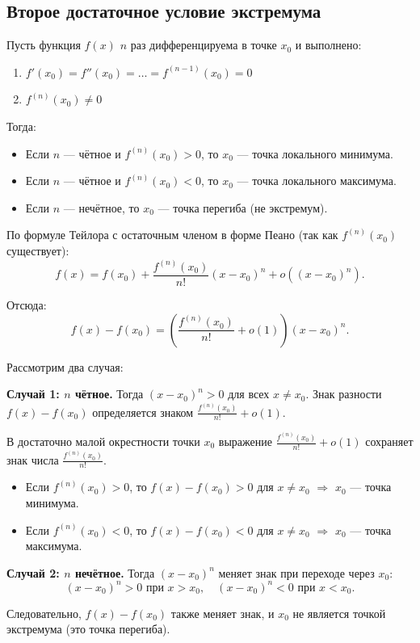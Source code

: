 \subsection{Второе достаточное условие экстремума}

\begin{theorem}
    Пусть функция \(f(x)\) \(n\) раз дифференцируема в точке \(x_0\) и выполнено:
    \begin{enumerate}
        \item \(f'(x_0) = f''(x_0) = \dots = f^{(n-1)}(x_0) = 0\)
        \item \(f^{(n)}(x_0) \neq 0\)
    \end{enumerate}
    
    Тогда:
    \begin{itemize}
        \item Если \(n\) — чётное и \(f^{(n)}(x_0) > 0\), то \(x_0\) — точка локального минимума.
        \item Если \(n\) — чётное и \(f^{(n)}(x_0) < 0\), то \(x_0\) — точка локального максимума.
        \item Если \(n\) — нечётное, то \(x_0\) — точка перегиба (не экстремум).
    \end{itemize}
\end{theorem}

\begin{Proof}
    По формуле Тейлора с остаточным членом в форме Пеано (так как \(f^{(n)}(x_0)\) существует):
    \[
    f(x) = f(x_0) + \frac{f^{(n)}(x_0)}{n!} (x - x_0)^n + o((x - x_0)^n).
    \]
    
    Отсюда:
    \[
    f(x) - f(x_0) = \left( \frac{f^{(n)}(x_0)}{n!} + o(1) \right) (x - x_0)^n.
    \]
    
    Рассмотрим два случая:
    
    \textbf{Случай 1: \(n\) чётное.}
    Тогда \((x - x_0)^n > 0\) для всех \(x \neq x_0\). Знак разности \(f(x) - f(x_0)\) определяется знаком \(\frac{f^{(n)}(x_0)}{n!} + o(1)\).
    
    В достаточно малой окрестности точки \(x_0\) выражение \(\frac{f^{(n)}(x_0)}{n!} + o(1)\) сохраняет знак числа \(\frac{f^{(n)}(x_0)}{n!}\).
    \begin{itemize}
        \item Если \(f^{(n)}(x_0) > 0\), то \(f(x) - f(x_0) > 0\) для \(x \neq x_0\) \(\Rightarrow\) \(x_0\) — точка минимума.
        \item Если \(f^{(n)}(x_0) < 0\), то \(f(x) - f(x_0) < 0\) для \(x \neq x_0\) \(\Rightarrow\) \(x_0\) — точка максимума.
    \end{itemize}
    
    \textbf{Случай 2: \(n\) нечётное.}
    Тогда \((x - x_0)^n\) меняет знак при переходе через \(x_0\):
    \[
    (x - x_0)^n > 0 \text{ при } x > x_0, \quad (x - x_0)^n < 0 \text{ при } x < x_0.
    \]
    
    Следовательно, \(f(x) - f(x_0)\) также меняет знак, и \(x_0\) не является точкой экстремума (это точка перегиба).
\end{Proof}


